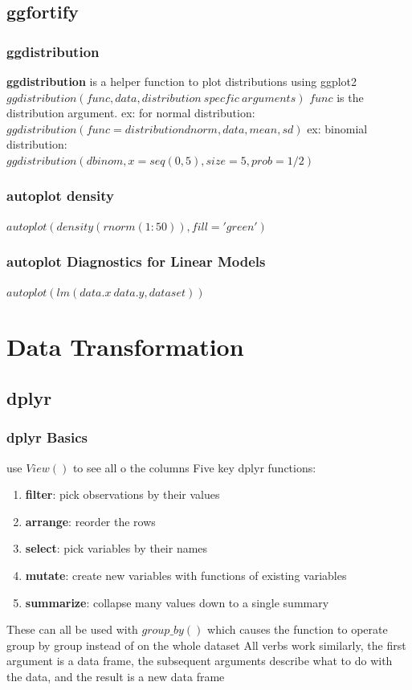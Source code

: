 \documentclass[openany]{book}
\begin{document}
\begin{flushleft}
\chapter{ggfortify}
\section{ggdistribution}
\textbf{ggdistribution} is a helper function to plot distributions using ggplot2 \medbreak
$ggdistribution(func,data,distribution \ specfic \ arguments)$\medbreak
$func$ is the distribution argument. \medbreak
ex: for normal distribution:\\
$ggdistribution(func=distributiondnorm,data,mean,sd)$\medbreak
ex: binomial distribution:\\
$ggdistribution(dbinom,x=seq(0,5),size=5,prob=1/2)$
\section{autoplot density}
$autoplot(density(rnorm(1:50)),fill='green')$
\section{autoplot Diagnostics for Linear Models}
$autoplot(lm(data.x~data.y,dataset))$
\part{Data Transformation}
\chapter{dplyr}
\section{dplyr Basics}
use $View()$ to see all o the columns \medbreak
Five key dplyr functions:
\begin{enumerate}
\item \textbf{filter}: pick observations by their values
\item \textbf{arrange}: reorder the rows
\item \textbf{select}: pick variables by their names
\item \textbf{mutate}: create new variables with functions of existing variables
\item \textbf{summarize}: collapse many values down to a single summary
\end{enumerate}
These can all be used with $group\_by()$ which causes the function to operate group by group instead of on the whole dataset\medbreak
All verbs work similarly, the first argument is a data frame, the subsequent arguments describe what to do with the data, and the result is a new data frame

\end{flushleft}
\end{document}
